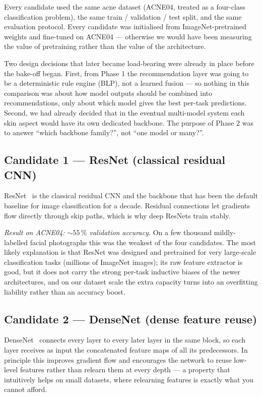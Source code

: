 \documentclass[11pt,a4paper,oneside]{report}
\begin{document}
Every candidate used the same acne dataset (ACNE04, treated as a
four-class classification problem), the same train / validation /
test split, and the same evaluation protocol. Every candidate was
initialised from ImageNet-pretrained weights and fine-tuned on
ACNE04 --- otherwise we would have been measuring the value of
pretraining rather than the value of the architecture.

Two design decisions that later became load-bearing were already in
place before the bake-off began. First, from Phase 1 the
recommendation layer was going to be a deterministic rule engine
(BLP), not a learned fusion --- so nothing in this comparison was
about how model outputs should be combined into recommendations,
only about which model gives the best per-task predictions. Second,
we had already decided that in the eventual multi-model system each
skin aspect would have its own dedicated backbone. The purpose of
Phase 2 was to answer ``which backbone family?'', not ``one model or
many?''.

\subsection{Candidate 1 --- ResNet (classical residual CNN)}

ResNet~\cite{he2016deep} is the classical residual CNN and the
backbone that has been the default baseline for image classification
for a decade. Residual connections let gradients flow directly
through skip paths, which is why deep ResNets train stably.

\emph{Result on ACNE04: \(\sim 55\,\%\) validation accuracy.} On a
few thousand mildly-labelled facial photographs this was the weakest
of the four candidates. The most likely explanation is that ResNet
was designed and pretrained for very large-scale classification
tasks (millions of ImageNet images); its raw feature extractor is
good, but it does not carry the strong per-task inductive biases of
the newer architectures, and on our dataset scale the extra capacity
turns into an overfitting liability rather than an accuracy boost.

\subsection{Candidate 2 --- DenseNet (dense feature reuse)}

DenseNet~\cite{huang2017densely} connects every layer to every
later layer in the same block, so each layer receives as input the
concatenated feature maps of all its predecessors. In principle
this improves gradient flow and encourages the network to reuse
low-level features rather than relearn them at every depth --- a
property that intuitively helps on small datasets, where relearning
features is exactly what you cannot afford.
\end{document}
